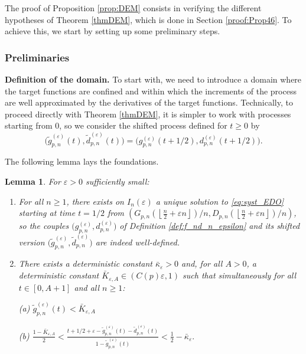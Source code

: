 \documentclass[a4, 11pt]{article}
\numberwithin{equation}{section}
\theoremstyle{plain}
\newtheorem{lemma}[theorem]{Lemma}
\theoremstyle{definition}
\theoremstyle{remark}
\begin{document}
The proof of Proposition \ref{prop:DEM} consists in verifying the different hypotheses of Theorem \ref{thmDEM}, which is done in Section \ref{proof:Prop46}. To achieve this, we start by setting up some preliminary steps.

\subsubsection{Preliminaries}

\textbf{Definition of the domain.} To start with, we need to introduce a domain where the target functions are confined and within which the increments of the process are well approximated by the derivatives of the target functions. Technically, to proceed directly with Theorem \ref{thmDEM}, it is simpler to work with processes starting from 0, so we consider the shifted process defined for $t \geq 0$ by
\begin{equation*}\label{def:F_n_tilde}
	\big(\tilde{g}_{p,n}^{(\varepsilon)}(t),\tilde{d}_{p,n}^{(\varepsilon)}(t)\big)=\big(g_{p,n}^{(\varepsilon)}(t+1/2),d_{p,n}^{(\varepsilon)}\left(t+1/2\right)\big).
\end{equation*} 

The following lemma lays the foundations.

\begin{lemma}\label{cor:edo_aleat} For $\varepsilon>0$ sufficiently small:
\begin{enumerate}[topsep=0cm]
\item[\emph{1)}] For all $n\geq 1$, there exists on $I_n(\varepsilon)$ a unique solution to \eqref{eq:syst_EDO} starting at time $t=1/2$ from $\left(G_{p,n}\left(\left\lfloor\frac{n}{2}+\varepsilon n\right\rfloor\right)/n, D_{p,n}\left(\left\lfloor\frac{n}{2}+\varepsilon n\right\rfloor\right)/n\right)$, so the couples $\big(g_{p,n}^{(\varepsilon)},d_{p,n}^{(\varepsilon)}\big)$ of Definition \ref{def:f_nd_n_epsilon} and its shifted version $\big(\tilde{g}_{p,n}^{(\varepsilon)},\tilde{d}_{p,n}^{(\varepsilon)}\big)$ are indeed well-defined.
\item[\emph{2)}] There exists a deterministic constant $\bar \kappa_{\varepsilon}>0$  and, for all $A>0$, a deterministic constant $\bar K_{\varepsilon,A}\in \left(C(p)\varepsilon,1\right)$ such that simultaneously for all $t\in \left[0,A+1\right]$ and all $n\geq 1$: 

 \emph{(a)} \hspace{0.1cm} $\tilde{g}_{p,n}^{(\varepsilon)}(t) < \bar K_{\varepsilon,A}$
 
 \emph{(b)} \hspace{0.1cm} $\displaystyle \frac{1-\bar K_{\varepsilon,A}}{2}< \frac{t+1/2+\varepsilon-\tilde{g}_{p,n}^{(\varepsilon)}(t)-\tilde{d}_{p,n}^{(\varepsilon)}(t)}{1-\tilde{g}_{p,n}^{(\varepsilon)}(t)}< \frac{1}{2}-\bar \kappa_{\varepsilon}.$
\end{enumerate}
\end{lemma}
\end{document}
